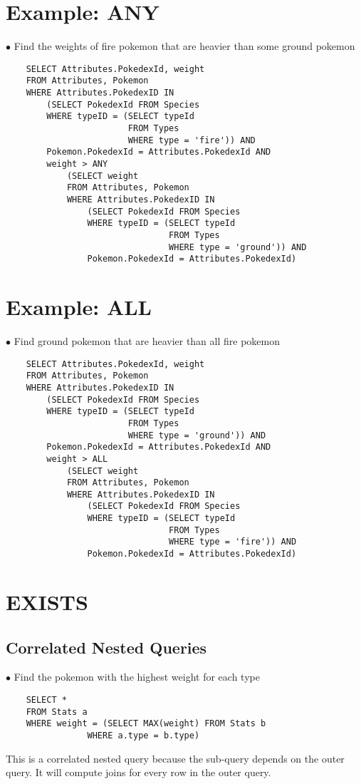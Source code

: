\documentclass[twoside]{article}
\begin{document}
\section*{Example: ANY}
$\bullet$ Find the weights of fire pokemon that are heavier than some ground
pokemon
\begin{verbatim}
    SELECT Attributes.PokedexId, weight
    FROM Attributes, Pokemon
    WHERE Attributes.PokedexID IN
        (SELECT PokedexId FROM Species
        WHERE typeID = (SELECT typeId
                        FROM Types 
                        WHERE type = 'fire')) AND 
        Pokemon.PokedexId = Attributes.PokedexId AND
        weight > ANY
            (SELECT weight
            FROM Attributes, Pokemon
            WHERE Attributes.PokedexID IN
                (SELECT PokedexId FROM Species
                WHERE typeID = (SELECT typeId
                                FROM Types 
                                WHERE type = 'ground')) AND 
                Pokemon.PokedexId = Attributes.PokedexId)
\end{verbatim}

\section*{Example: ALL}
$\bullet$ Find ground pokemon that are heavier than all fire pokemon
\begin{verbatim}
    SELECT Attributes.PokedexId, weight
    FROM Attributes, Pokemon
    WHERE Attributes.PokedexID IN
        (SELECT PokedexId FROM Species
        WHERE typeID = (SELECT typeId
                        FROM Types 
                        WHERE type = 'ground')) AND 
        Pokemon.PokedexId = Attributes.PokedexId AND
        weight > ALL
            (SELECT weight
            FROM Attributes, Pokemon
            WHERE Attributes.PokedexID IN
                (SELECT PokedexId FROM Species
                WHERE typeID = (SELECT typeId
                                FROM Types 
                                WHERE type = 'fire')) AND 
                Pokemon.PokedexId = Attributes.PokedexId)
\end{verbatim}

\section*{EXISTS}
\subsection*{Correlated Nested Queries}
$\bullet$ Find the pokemon with the highest weight for each type
\begin{verbatim}
    SELECT *
    FROM Stats a
    WHERE weight = (SELECT MAX(weight) FROM Stats b
                WHERE a.type = b.type)
\end{verbatim}
This is a correlated nested query because the sub-query depends on the outer
query. It will compute joins for every row in the outer query.
\end{document}
